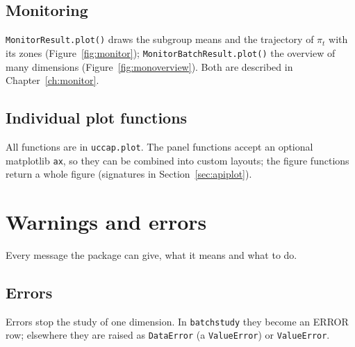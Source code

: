 \documentclass[a4paper,11pt,oneside,openany,parskip=half-,headings=standardclasses,toc=flat,numbers=noenddot]{scrbook}
\newcommand{\code}[1]{\texttt{\begingroup\def\_{\textunderscore\allowbreak}#1\endgroup}}
\newenvironment{chapterintro}{\begingroup\sffamily\small\color{muted}\noindent\ignorespaces}{\par\endgroup\medskip}
\newcommand{\secref}[1]{Section~\ref{#1}}
\newcommand{\chapref}[1]{Chapter~\ref{#1}}
\newcommand{\figref}[1]{Figure~\ref{#1}}
\begin{document}
\section{Monitoring}

\code{MonitorResult.plot()} draws the subgroup means and the trajectory of $\pi_t$ with its zones
(\figref{fig:monitor}); \code{MonitorBatchResult.plot()} the overview of many dimensions (\figref{fig:monoverview}).
Both are described in \chapref{ch:monitor}.

\section{Individual plot functions}
All functions are in \code{uccap.plot}. The panel functions accept an optional matplotlib \code{ax}, so they
can be combined into custom layouts; the figure functions return a whole figure (signatures in
\secref{sec:apiplot}).

\chapter{Warnings and errors}\label{ch:warnings}

\begin{chapterintro}
Every message the package can give, what it means and what to do.
\end{chapterintro}

\section{Errors}
Errors stop the study of one dimension. In \code{batch\_study} they become an ERROR row; elsewhere they are
raised as \code{DataError} (a \code{ValueError}) or \code{ValueError}.
\end{document}
